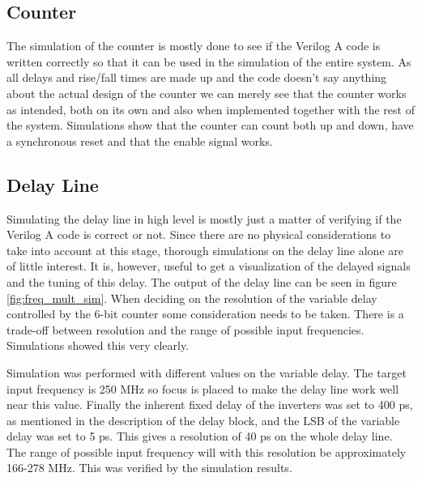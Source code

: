\documentclass[a4paper,12pt]{article} \usepackage{graphicx}
\begin{document}
\subsection{Counter}
The simulation of the counter is mostly done to see if the Verilog A code is 
written correctly so that it can be used in the simulation of the entire system.
As all delays and rise/fall times are made up and the code doesn't say anything 
about the actual design of the counter we can merely see that the counter 
works as intended, both on its own and also when implemented together with
the rest of the system.
Simulations show that the counter can count both up and down, have a synchronous
reset and that the enable signal works.

\subsection{Delay Line}
Simulating the delay line in high level is mostly just a matter of
verifying if the Verilog A code is correct or not. Since there are no physical
considerations to take into account at this stage, thorough simulations
on the delay line alone are of little interest. It is, however, useful
to get a visualization of the delayed signals and the tuning of this
delay. The output of the delay line can be seen in figure
\ref{fig:freq_mult_sim}. 
When deciding on the resolution of the variable delay
controlled by the 6-bit counter some consideration needs to be taken. 
There is a trade-off between resolution and the
range of possible input frequencies. Simulations showed this very
clearly. 

Simulation was performed with different values on the variable
delay. The target input frequency is 250 MHz so focus is placed to make
the delay line work well near this value. Finally the inherent fixed
delay of the inverters was set to 400 ps, as mentioned in the
description of the delay block, and the
LSB of the variable delay was set to 5 ps. This gives a resolution of
40 ps on the whole delay line. The range of possible input frequency
will with this resolution be approximately 166-278 MHz. This was
verified by the simulation results.
\end{document}
